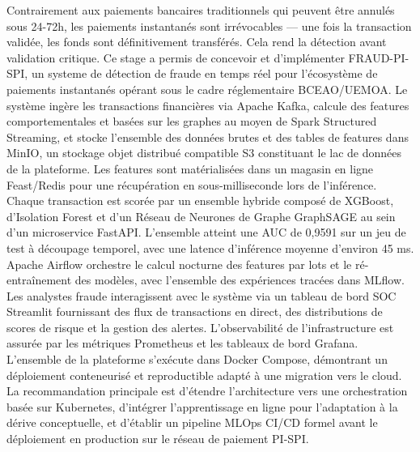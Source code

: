 \documentclass[12pt,a4paper,oneside]{book}
\theoremstyle{definition}
\theoremstyle{plain}
\begin{document}
Contrairement aux paiements bancaires traditionnels qui peuvent être annulés sous 24-72h, les paiements instantanés sont irrévocables — une fois la transaction validée, les fonds sont définitivement transférés. Cela rend la détection avant validation critique. Ce stage a permis de concevoir et d'implémenter FRAUD-PI-SPI, un systeme de détection de fraude en temps réel pour l'écosystème de paiements instantanés opérant sous le cadre réglementaire BCEAO/UEMOA. Le système ingère les transactions financières via Apache Kafka, calcule des features comportementales et basées sur les graphes au moyen de Spark Structured Streaming, et stocke l'ensemble des données brutes et des tables de features dans MinIO, un stockage objet distribué compatible S3 constituant le lac de données de la plateforme. Les features sont matérialisées dans un magasin en ligne Feast/Redis pour une récupération en sous-milliseconde lors de l'inférence. Chaque transaction est scorée par un ensemble hybride composé de XGBoost, d'Isolation Forest et d'un Réseau de Neurones de Graphe GraphSAGE au sein d'un microservice FastAPI. L'ensemble atteint une AUC de 0,9591 sur un jeu de test à découpage temporel, avec une latence d'inférence moyenne d'environ 45 ms. 
Apache Airflow orchestre le calcul nocturne des features par lots et le ré-entraînement des modèles, avec l'ensemble des expériences tracées dans MLflow. Les analystes fraude interagissent avec le système via un tableau de bord SOC Streamlit fournissant des flux de transactions en direct, des distributions de scores de risque et la gestion des alertes. L'observabilité de l'infrastructure est assurée par les métriques Prometheus et les tableaux de bord Grafana. L'ensemble de la plateforme s'exécute dans Docker Compose, démontrant un déploiement conteneurisé et reproductible adapté à une migration vers le cloud. La recommandation principale est d'étendre l'architecture vers une orchestration basée sur Kubernetes, d'intégrer l'apprentissage en ligne pour l'adaptation à la dérive conceptuelle, et d'établir un pipeline MLOps CI/CD formel avant le déploiement en production sur le réseau de paiement PI-SPI.
\cleardoublepage

\tableofcontents
\cleardoublepage

\listoffigures
{}
\cleardoublepage

\listoftables
{}
\cleardoublepage
\end{document}
